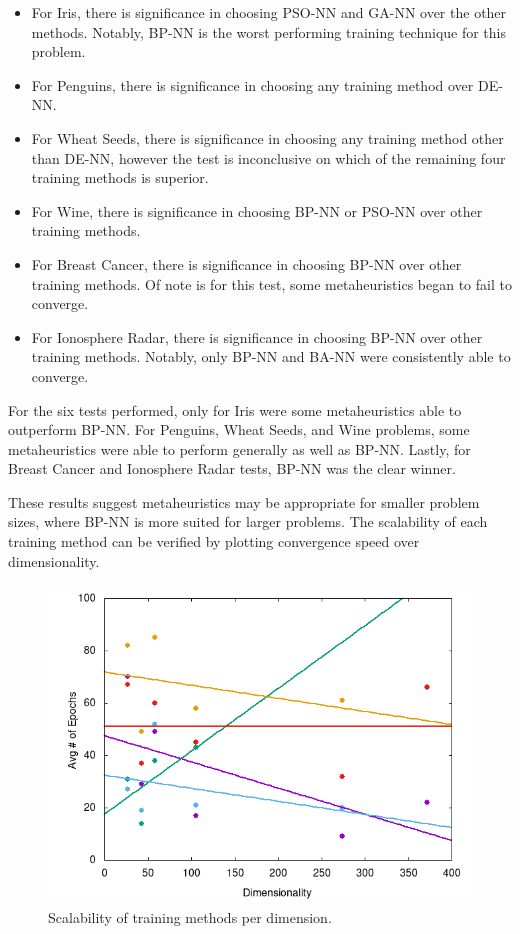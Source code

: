 \documentclass[a4paper,12pt]{article}
\begin{document}
\begin{itemize}
    \item For Iris, there is significance in choosing PSO-NN and GA-NN over the other methods. Notably, BP-NN is the worst performing training technique for this problem.
    \item For Penguins, there is significance in choosing any training method over DE-NN.
    \item For Wheat Seeds, there is significance in choosing any training method other than DE-NN, however the test is inconclusive on which of the remaining four training methods is superior.
    \item For Wine, there is significance in choosing BP-NN or PSO-NN over other training methods.
    \item For Breast Cancer, there is significance in choosing BP-NN over other training methods. Of note is for this test, some metaheuristics began to fail to converge.
    \item For Ionosphere Radar, there is significance in choosing BP-NN over other training methods. Notably, only BP-NN and BA-NN were consistently able to converge.
\end{itemize}

For the six tests performed, only for Iris were some metaheuristics able to outperform BP-NN. For Penguins, Wheat Seeds, and Wine problems, some metaheuristics were able to perform generally as well as BP-NN. Lastly, for Breast Cancer and Ionosphere Radar tests, BP-NN was the clear winner.

These results suggest metaheuristics may be appropriate for smaller problem sizes, where BP-NN is more suited for larger problems. The scalability of each training method can be verified by plotting convergence speed over dimensionality.

\begin{figure}[h!]
\centering
\includegraphics[scale=0.60]{images/best-fit.png}
\caption{Scalability of training methods per dimension.}
\label{fig:best-fit}
\end{figure}
\end{document}
